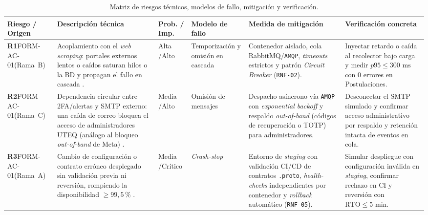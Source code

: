 \documentclass[11pt,a4paper]{article}
\begin{document}
\begin{table}[htbp]
\centering
\caption{Matriz de riesgos técnicos, modelos de fallo, mitigación y verificación.}
\label{tab:riesgos}
\footnotesize
\setlength{\tabcolsep}{3pt}
\begin{tabularx}{\textwidth}{>{\raggedright\arraybackslash}p{1.75cm} >{\raggedright\arraybackslash}p{2.9cm} >{\centering\arraybackslash}p{1.25cm} >{\raggedright\arraybackslash}p{1.75cm} >{\raggedright\arraybackslash}X >{\raggedright\arraybackslash}p{2.95cm}}
\toprule
\textbf{Riesgo / Origen} & \textbf{Descripción técnica} & \textbf{Prob. / Imp.} & \textbf{Modelo de fallo} & \textbf{Medida de mitigación} & \textbf{Verificación concreta} \\
\midrule
\textbf{R1}\newline FORM-AC-01\newline (Rama~B) & Acoplamiento con el \textit{web scraping}: portales externos lentos o caídos saturan hilos o la BD y propagan el fallo en cascada \cite{janardhan2021outage,zheng2026tolerance}. & Alta /\newline Alto & Temporización y omisión en cascada & Contenedor aislado, cola RabbitMQ/\texttt{AMQP}, \textit{timeouts} estrictos y patrón \textit{Circuit Breaker} (\texttt{RNF-02}). & Inyectar retardo o caída al recolector bajo carga y medir $p95 \le 300\text{ ms}$ con 0 errores en Postulaciones. \\
\addlinespace
\textbf{R2}\newline FORM-AC-01\newline (Rama~C) & Dependencia circular entre 2FA/alertas y SMTP externo: una caída de correo bloquea el acceso de administradores UTEQ (análogo al bloqueo \textit{out-of-band} de Meta) \cite{janardhan2021outage}. & Media /\newline Alto & Omisión de mensajes & Despacho asíncrono vía \texttt{AMQP} con \textit{exponential backoff} y respaldo \textit{out-of-band} (códigos de recuperación o TOTP) para administradores. & Desconectar el SMTP simulado y confirmar acceso administrativo por respaldo y retención intacta de eventos en cola. \\
\addlinespace
\textbf{R3}\newline FORM-AC-01\newline (Rama~A) & Cambio de configuración o contrato erróneo desplegado sin validación previa ni reversión, rompiendo la disponibilidad $\ge 99{,}5$\,\% \cite{janardhan2021outage}. & Media /\newline Crítico & \textit{Crash-stop} & Entorno de \textit{staging} con validación CI/CD de contratos \texttt{.proto}, \textit{health-checks} independientes por contenedor y \textit{rollback} automático (\texttt{RNF-05}). & Simular despliegue con configuración inválida en \textit{staging}, confirmar rechazo en CI y reversión con $\text{RTO} \le 5\text{ min}$. \\

\end{tabularx}
\end{table}
\end{document}
